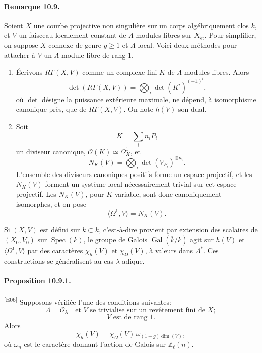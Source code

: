\documentclass[10pt,letterpaper]{article}
\newcommand{\Z}{\mathbb Z}
\newcommand{\Gal}{\operatorname{Gal}}
\newcommand{\Spec}{\operatorname{Spec}}
\providecommand{\Spec}{\operatorname{Spec}}
\providecommand{\Gal}{\operatorname{Gal}}
\providecommand{\Gal}{\operatorname{Gal}}
\providecommand{\Spec}{\operatorname{Spec}}
\providecommand{\Spec}{\operatorname{Spec}}
\providecommand{\Gal}{\operatorname{Gal}}
\providecommand{\Gal}{\operatorname{Gal}}
\newcommand{\auditmark}[1]{\textsuperscript{\normalfont\scriptsize[E#1]}}
\begin{document}
\paragraph{Remarque 10.9.} Soient \(X\) une courbe projective non singulière sur un corps algébriquement clos \(\overline k\), et \(V\) un faisceau localement constant de \(\Lambda\)-modules libres sur \(X_{\mathrm{\acute et}}\). Pour simplifier, on suppose \(X\) connexe de genre \(g\ge1\) et \(\Lambda\) local. Voici deux méthodes pour attacher à \(V\) un \(\Lambda\)-module libre de rang \(1\).

\begin{enumerate}[label=(\alph*)]
\item Écrivons \(R\Gamma(X,V)\) comme un complexe fini \(K\) de \(\Lambda\)-modules libres. Alors
\[
\det(R\Gamma(X,V))=
\bigotimes_i \det(K^i)^{(-1)^i},
\]
où \(\det\) désigne la puissance extérieure maximale, ne dépend, à isomorphisme canonique près, que de \(R\Gamma(X,V)\). On note \(h(V)\) son dual.

\item Soit
\[
K=\sum_i n_iP_i
\]
un diviseur canonique, \(\mathcal O(K)\simeq\Omega_X^1\), et
\[
N_K(V)=\bigotimes_i \det(V_{P_i})^{\otimes n_i}.
\]
L'ensemble des diviseurs canoniques positifs forme un espace projectif, et les \(N_K(V)\) forment un système local nécessairement trivial sur cet espace projectif. Les \(N_K(V)\), pour \(K\) variable, sont donc canoniquement isomorphes, et on pose
\[
\langle\Omega^1,V\rangle=N_K(V).
\]
\end{enumerate}

Si \((X,V)\) est défini sur \(k\subset\overline k\), c'est-à-dire provient par extension des scalaires de \((X_0,V_0)\) sur \(\Spec(k)\), le groupe de Galois \(\Gal(\overline k/k)\) agit sur \(h(V)\) et \(\langle\Omega^1,V\rangle\) par des caractères \(\chi_h(V)\) et \(\chi_{\Omega}(V)\), à valeurs dans \(\Lambda^*\). Ces constructions se généralisent au cas \(\lambda\)-adique.

\paragraph{Proposition 10.9.1.}\auditmark{06} Supposons vérifiée l'une des conditions suivantes:
\[
\tag{a}
\Lambda=\mathcal O_\lambda\quad\text{et }V\text{ se trivialise sur un revêtement fini de }X;
\]
\[
\tag{b}
V\text{ est de rang }1.
\]
Alors
\[
\tag{10.9.1}
\chi_h(V)=\chi_{\Omega}(V)\,\omega_{(1-g)\dim(V)},
\]
où \(\omega_n\) est le caractère donnant l'action de Galois sur \(\Z_\ell(n)\).
\end{document}
